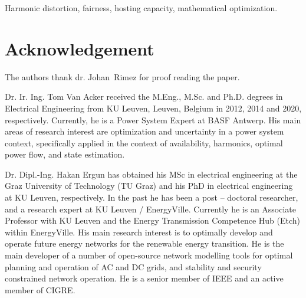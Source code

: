 \documentclass[journal]{IEEEtran}
\begin{document}
\begin{IEEEkeywords}
Harmonic distortion, fairness, hosting capacity, mathematical optimization.
\end{IEEEkeywords}

\IEEEpeerreviewmaketitle







\section*{Acknowledgement}
The authors thank dr. Johan~Rimez for proof reading the paper.




\begin{IEEEbiographynophoto}{Dr. Ir. Ing. Tom Van Acker} received the M.Eng., M.Sc. and Ph.D. degrees in Electrical Engineering from KU Leuven, Leuven, Belgium in 2012, 2014 and 2020, respectively. Currently, he is a Power System Expert at BASF Antwerp. His main areas of research interest are optimization and uncertainty in a power system context, specifically applied in the context of availability, harmonics, optimal power flow, and state estimation. 
\end{IEEEbiographynophoto}

\begin{IEEEbiographynophoto}{Dr. Dipl.-Ing. Hakan Ergun} has obtained his MSc in electrical engineering at the Graz University of Technology (TU Graz) and his PhD in electrical engineering at KU Leuven, respectively. In the past he has been a post – doctoral researcher, and a research expert at KU Leuven / EnergyVille. Currently he is an Associate Professor with KU Leuven and the Energy Transmission Competence Hub (Etch) within EnergyVille.
His main research interest is to optimally develop and operate future energy networks for the renewable energy transition. He is the main developer of a number of open-source network modelling tools for optimal planning and operation of AC and DC grids, and stability and security constrained network operation. He is a senior member of IEEE and an active member of CIGRE. 

\end{IEEEbiographynophoto}
\end{document}
